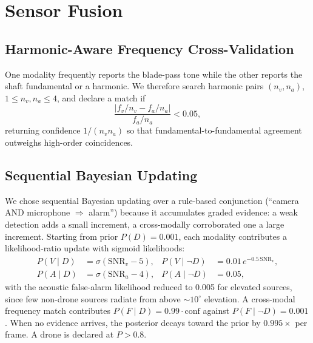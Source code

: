 \documentclass[conference]{IEEEtran}
\begin{document}
\section{Sensor Fusion}
\label{sec:fusion}

\subsection{Harmonic-Aware Frequency Cross-Validation}
One modality frequently reports the blade-pass tone while the other
reports the shaft fundamental or a harmonic. We therefore search harmonic
pairs $(n_v, n_a)$, $1 \le n_v, n_a \le 4$, and declare a match if
\begin{equation}
\frac{\left| f_v / n_v - f_a / n_a \right|}{f_a / n_a} < 0.05,
\label{eq:harmonic}
\end{equation}
returning confidence $1 / (n_v n_a)$ so that fundamental-to-fundamental
agreement outweighs high-order coincidences.

\subsection{Sequential Bayesian Updating}
We chose sequential Bayesian updating over a rule-based conjunction
(``camera AND microphone $\Rightarrow$ alarm'') because it accumulates
graded evidence: a weak detection adds a small increment, a
cross-modally corroborated one a large increment. Starting from prior
$P(D) = 0.001$, each modality contributes a likelihood-ratio update with
sigmoid likelihoods:
\begin{align}
P(V \mid D) &= \sigma(\mathrm{SNR}_v - 5), &
P(V \mid \neg D) &= 0.01\, e^{-0.5\,\mathrm{SNR}_v}, \\
P(A \mid D) &= \sigma(\mathrm{SNR}_a - 4), &
P(A \mid \neg D) &= 0.05,
\end{align}
with the acoustic false-alarm likelihood reduced to 0.005 for elevated
sources, since few non-drone sources radiate from above
${\sim}10^{\circ}$ elevation. A cross-modal frequency match contributes
$P(F \mid D) = 0.99 \cdot \mathrm{conf}$ against
$P(F \mid \neg D) = 0.001$. When no evidence arrives, the posterior
decays toward the prior by $0.995\times$ per frame. A drone is declared
at $P > 0.8$.
\end{document}
